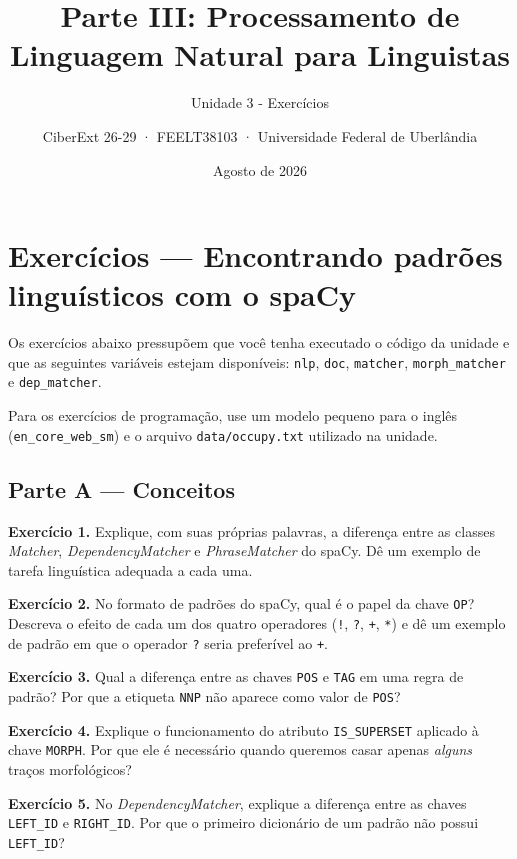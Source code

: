 \documentclass[
  brazilian,
]{article}
\title{Parte III: Processamento de Linguagem Natural para Linguistas}
\subtitle{Unidade 3 - Exercícios}
\author{CiberExt 26-29 · FEELT38103 · Universidade Federal de
Uberlândia}
\date{Agosto de 2026}
\begin{document}
\maketitle

\hypertarget{exercuxedcios-encontrando-padruxf5es-linguuxedsticos-com-o-spacy}{%
\section{Exercícios --- Encontrando padrões linguísticos com o
spaCy}\label{exercuxedcios-encontrando-padruxf5es-linguuxedsticos-com-o-spacy}}

Os exercícios abaixo pressupõem que você tenha executado o código da
unidade e que as seguintes variáveis estejam disponíveis: \texttt{nlp},
\texttt{doc}, \texttt{matcher}, \texttt{morph\_matcher} e
\texttt{dep\_matcher}.

Para os exercícios de programação, use um modelo pequeno para o inglês
(\texttt{en\_core\_web\_sm}) e o arquivo \texttt{data/occupy.txt}
utilizado na unidade.

\hypertarget{parte-a-conceitos}{%
\subsection{Parte A --- Conceitos}\label{parte-a-conceitos}}

\textbf{Exercício 1.} Explique, com suas próprias palavras, a diferença
entre as classes \emph{Matcher}, \emph{DependencyMatcher} e
\emph{PhraseMatcher} do spaCy. Dê um exemplo de tarefa linguística
adequada a cada uma.

\textbf{Exercício 2.} No formato de padrões do spaCy, qual é o papel da
chave \texttt{OP}? Descreva o efeito de cada um dos quatro operadores
(\texttt{!}, \texttt{?}, \texttt{+}, \texttt{*}) e dê um exemplo de
padrão em que o operador \texttt{?} seria preferível ao \texttt{+}.

\textbf{Exercício 3.} Qual a diferença entre as chaves \texttt{POS} e
\texttt{TAG} em uma regra de padrão? Por que a etiqueta \texttt{NNP} não
aparece como valor de \texttt{POS}?

\textbf{Exercício 4.} Explique o funcionamento do atributo
\texttt{IS\_SUPERSET} aplicado à chave \texttt{MORPH}. Por que ele é
necessário quando queremos casar apenas \emph{alguns} traços
morfológicos?

\textbf{Exercício 5.} No \emph{DependencyMatcher}, explique a diferença
entre as chaves \texttt{LEFT\_ID} e \texttt{RIGHT\_ID}. Por que o
primeiro dicionário de um padrão não possui \texttt{LEFT\_ID}?
\end{document}
